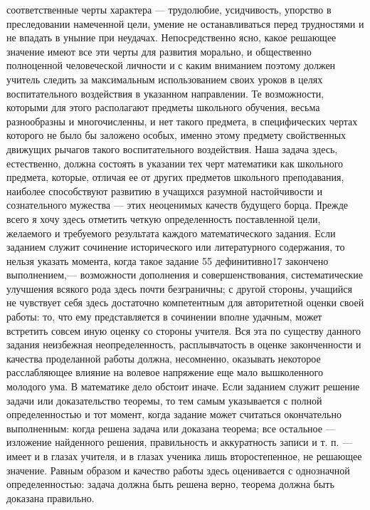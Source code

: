 \documentclass[12pt, a4paper, openany]{book}
\begin{document}
соответственные черты характера — трудолюбие, усидчивость, 
упорство в преследовании намеченной цели, умение не 
останавливаться перед трудностями и не впадать в уныние 
при неудачах. Непосредственно ясно, какое решающее 
значение имеют все эти черты для развития морально, и 
общественно полноценной человеческой личности и с  
каким вниманием поэтому должен учитель следить за  
максимальным использованием своих уроков в целях  
воспитательного воздействия в указанном направлении. Те  
возможности, которыми для этого располагают предметы 
школьного обучения, весьма разнообразны и  
многочисленны, и нет такого предмета, в специфических чертах 
которого не было бы заложено особых, именно этому  
предмету свойственных движущих рычагов такого  
воспитательного воздействия. Наша задача здесь, естественно, должна 
состоять в указании тех черт математики как школьного 
предмета, которые, отличая ее от других предметов  
школьного преподавания, наиболее способствуют развитию в 
учащихся разумной настойчивости и сознательного  
мужества — этих неоценимых качеств будущего борца. 
Прежде всего я хочу здесь отметить четкую  
определенность поставленной цели, желаемого и требуемого  
результата каждого математического задания. Если заданием 
служит сочинение исторического или литературного  
содержания, то нельзя указать момента, когда такое задание 
55 
дефинитивно17 закончено выполнением,— возможности  
дополнения и совершенствования, систематические  
улучшения всякого рода здесь почти безграничны; с другой  
стороны, учащийся не чувствует себя здесь достаточно  
компетентным для авторитетной оценки своей работы: то, что 
ему представляется в сочинении вполне удачным, может 
встретить совсем иную оценку со стороны учителя. Вся 
эта по существу данного задания неизбежная  
неопределенность, расплывчатость в оценке законченности и качества 
проделанной работы должна, несомненно, оказывать  
некоторое расслабляющее влияние на волевое напряжение 
еще мало вышколенного молодого ума. В математике дело 
обстоит иначе. Если заданием служит решение задачи 
или доказательство теоремы, то тем самым указывается 
с полной определенностью и тот момент, когда задание 
может считаться окончательно выполненным: когда решена 
задача или доказана теорема; все остальное — изложение 
найденного решения, правильность и аккуратность  
записи и т. п. — имеет и в глазах учителя, и в глазах  
ученика лишь второстепенное, не решающее значение.  
Равным образом и качество работы здесь оценивается с  
однозначной определенностью: задача должна быть решена 
верно, теорема должна быть доказана правильно.  
\end{document}
